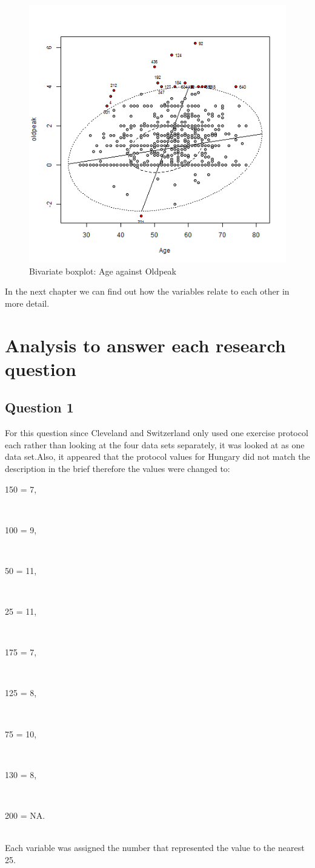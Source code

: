 \documentclass[a4paper]{article}
\begin{document}
\begin{figure}[H]
	\begin{center}
		\includegraphics[width=12cm]{intro files/intplot5.png}
	\end{center}
	\caption{Bivariate boxplot: Age against Oldpeak}
\end{figure}


In the next chapter we can find out how the variables relate to each other in
more detail.

\section{Analysis to answer each research question}

\subsection{Question 1}
For this question since Cleveland and Switzerland only used one exercise
protocol each rather than looking at the four data sets separately, it was
looked at as one data set.Also, it appeared that the protocol values for Hungary
did not match the description in the brief therefore the values were changed
to:\\
\centerline{150 = 7,}\\
\centerline{100 = 9,}\\
\centerline{50 = 11,}\\
\centerline{25 = 11,}\\
\centerline{175 = 7,}\\
\centerline{125 = 8,}\\
\centerline{75 = 10,}\\
\centerline{130 = 8,}\\
\centerline{200 = NA.}\\
Each variable was assigned the number that represented the value to the nearest
25.
\end{document}

